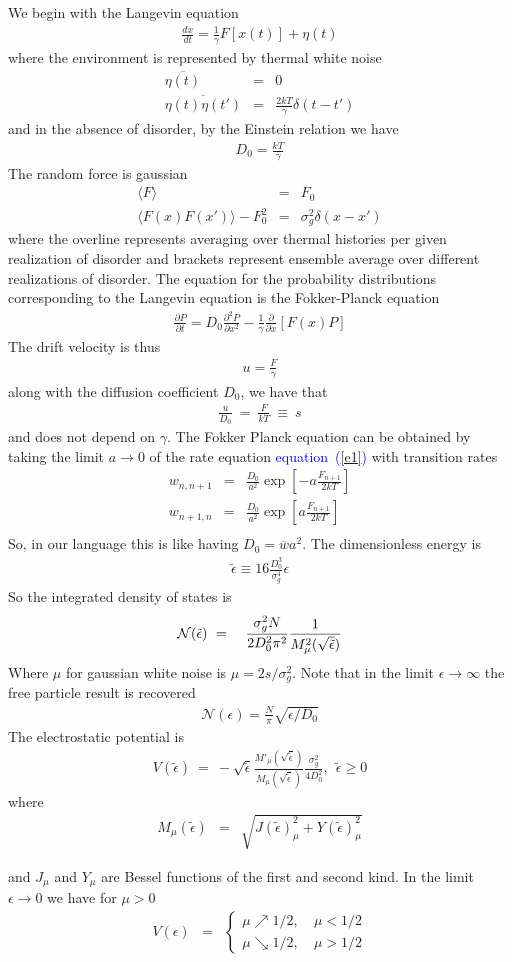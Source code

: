 \documentclass[aps,pre,floats,floatfix,twocolumn]{revtex4}
\newcommand{\be}[1]{\begin{eqnarray}\ifthenelse{#1=-1}{\nonumber}{\ifthenelse{#1=0}{}{\label{e#1}}}}
\newcommand{\beq}{\begin{eqnarray}}
\newcommand{\eeq}{\end{eqnarray}}
\newcommand{\Eq}[1]{\textcolor{blue}{{equation}\!~(\ref{#1})}}
\begin{document}
We begin with the Langevin equation
%
\beq
\frac{dx}{dt} = \frac{1}{\gamma} F\left[x(t)\right] + \eta(t)
\eeq
%
where the environment is represented by thermal white noise 
%
\beq
\overline{\eta(t)} &=& 0 \\ 
\overline{\eta(t)\eta(t')} &=& \frac{2kT}{\gamma} \delta(t-t')
\eeq
%
and in the absence of disorder, by the Einstein relation we have 
%
\beq
D_0 = \frac{kT}{\gamma}
\eeq
%
The random force is gaussian 
%
\beq
\langle F \rangle &=& F_0 \\ 
\langle F(x)F(x') \rangle - F_0^2 &=& \sigma_g^2 \delta(x-x')
\eeq
%
where the overline represents averaging over thermal histories per given realization of disorder
and brackets represent ensemble average over different realizations of disorder. 
The equation for the probability distributions corresponding to the Langevin equation is the Fokker-Planck equation
%
\beq
\frac{\partial P}{\partial t} = D_0 \frac{\partial^2 P}{\partial x^2} - \frac{1}{\gamma} \frac{\partial }{\partial x} \left[ F(x) P\right]
\eeq
%
The drift velocity is thus 
%
\beq
u = \frac{F}{\gamma}
\eeq
%
along with the diffusion coefficient $D_0$, we have that 
%
\beq
\frac{u}{D_0} \ = \ \frac{F}{kT} \ \equiv \ s
\eeq
%
and does not depend on $\gamma$. 
%
The Fokker Planck equation can be obtained by taking the limit $a\to 0$ of the rate equation \Eq{e1} with transition rates 
%
\beq
w_{n,n+1} &=& \frac{D_0}{a^2}\exp\left[-a\frac{F_{n+1}}{2kT}\right]\\
w_{n+1,n} &=& \frac{D_0}{a^2}\exp\left[a\frac{F_{n+1}}{2kT}\right]\\
\eeq
%
So, in our language this is like having $D_0 = \overline{w} a^2$.
The dimensionless energy is 
\beq
\tilde{\epsilon} \equiv 16\frac{D_0^3}{\sigma_g^4} \epsilon 
\eeq
%
So the integrated density of states is 
%
\be{931}
\mathcal{N}(\tilde{\epsilon} )   \ &=& \ \frac{\sigma_g^2 N}{2D_0^2\pi^2}\frac{1}{ M_{\mu}^2 (\sqrt{\tilde{\epsilon} })}
\eeq
%
Where $\mu$ for gaussian white noise is ${\mu=2s/ \sigma_g^2}$.
Note that in the limit $\epsilon\to \infty$ the free particle result is recovered
%
\beq
\mathcal{N}(\epsilon) = \frac{N}{\pi} \sqrt{\epsilon/D_0}
\eeq
%
The electrostatic potential is
%
\beq
 V(\tilde{\epsilon} ) \ = \ -\sqrt{\tilde{\epsilon} } \frac{M'_{\mu}(\sqrt{\tilde{\epsilon} })}{M_{\mu}(\sqrt{\tilde{\epsilon} })} \frac{\sigma_g^2}{4D_0^2}, \ \ \tilde{\epsilon}  \geq 0
\eeq
%
where
\beq
M_{\mu}(\tilde{\epsilon} ) &=& \sqrt{J(\tilde{\epsilon} )^2_{\mu} + Y(\tilde{\epsilon} )^2_{\mu}}
\eeq
%

and $J_{\mu}$ and $Y_{\mu}$ are Bessel functions of the first and second kind.
%
In the limit $\epsilon \to 0$ we have for $\mu>0$
%
\beq
V(\epsilon) &=& 
\left\{
\begin{array}{cc}
\mu \nearrow 1/2, \ &  \mu<1/2 \\
\mu \searrow 1/2, \ &  \mu>1/2 
\end{array}\right.
\eeq
\end{document}
